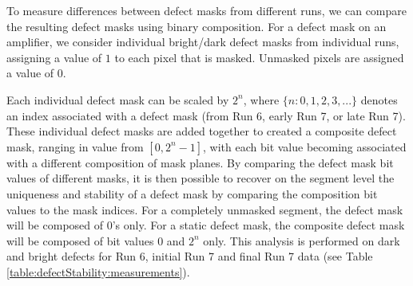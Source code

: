 To measure differences between defect masks from different runs, we can compare the resulting defect masks using binary composition. For a defect mask on an amplifier, we consider individual bright/dark defect masks from individual runs, assigning a value of $1$ to each pixel that is masked. Unmasked pixels are assigned a value of $0$.


Each individual defect mask can be scaled by $2^{n}$, where $\{n:0,1,2,3,... \}$ denotes an index associated with a defect mask (from Run 6, early Run 7, or late Run 7). These individual defect masks are added together to created a composite defect mask, ranging in value from $[0,2^{n}-1]$, with each bit value becoming associated with a different composition of mask planes. By comparing the defect mask bit values of different masks, it is then possible to recover on the segment level the uniqueness and stability of a defect mask by comparing the composition bit values to the mask indices. For a completely unmasked segment, the defect mask will be composed of 0's only. For a static defect mask, the composite defect mask will be composed of bit values 0 and $2^n$ only. This analysis is performed on dark and bright defects for Run 6, initial Run 7 and final Run 7 data (see Table \ref{table:defectStability:measurements}). 


